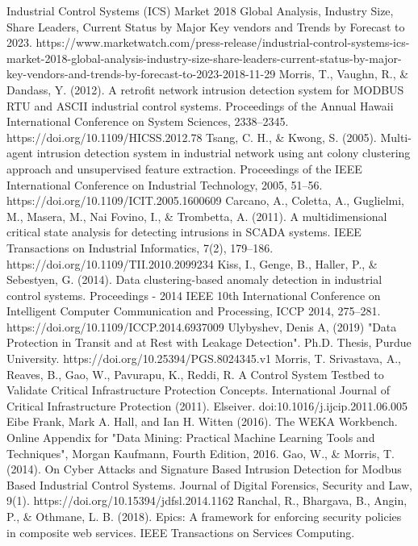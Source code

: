 \documentclass[conference]{IEEEtran}
\begin{document}
\begin{thebibliography}{00}
Industrial Control Systems (ICS) Market 2018 Global Analysis, Industry Size, Share Leaders, Current Status by Major Key vendors and Trends by Forecast to 2023. https://www.marketwatch.com/press-release/industrial-control-systems-ics-market-2018-global-analysis-industry-size-share-leaders-current-status-by-major-key-vendors-and-trends-by-forecast-to-2023-2018-11-29
Morris, T., Vaughn, R., \& Dandass, Y. (2012). A retrofit network intrusion detection system for MODBUS RTU and ASCII industrial control systems. Proceedings of the Annual Hawaii International Conference on System Sciences, 2338–2345. https://doi.org/10.1109/HICSS.2012.78
Tsang, C. H., \& Kwong, S. (2005). Multi-agent intrusion detection system in industrial network using ant colony clustering approach and unsupervised feature extraction. Proceedings of the IEEE International Conference on Industrial Technology, 2005, 51–56. https://doi.org/10.1109/ICIT.2005.1600609
Carcano, A., Coletta, A., Guglielmi, M., Masera, M., Nai Fovino, I., \& Trombetta, A. (2011). A multidimensional critical state analysis for detecting intrusions in SCADA systems. IEEE Transactions on Industrial Informatics, 7(2), 179–186. https://doi.org/10.1109/TII.2010.2099234
Kiss, I., Genge, B., Haller, P., \& Sebestyen, G. (2014). Data clustering-based anomaly detection in industrial control systems. Proceedings - 2014 IEEE 10th International Conference on Intelligent Computer Communication and Processing, ICCP 2014, 275–281. https://doi.org/10.1109/ICCP.2014.6937009
 Ulybyshev, Denis A, (2019) "Data Protection in Transit and at Rest with Leakage Detection". Ph.D. Thesis, Purdue University. https://doi.org/10.25394/PGS.8024345.v1
Morris, T. Srivastava, A., Reaves, B., Gao, W., Pavurapu, K., Reddi, R. A Control System Testbed to Validate Critical Infrastructure Protection Concepts. International Journal of Critical Infrastructure Protection (2011). Elseiver. doi:10.1016/j.ijcip.2011.06.005
Eibe Frank, Mark A. Hall, and Ian H. Witten (2016). The WEKA Workbench. Online Appendix for "Data Mining: Practical Machine Learning Tools and Techniques", Morgan Kaufmann, Fourth Edition, 2016.
Gao, W., \& Morris, T. (2014). On Cyber Attacks and Signature Based Intrusion Detection for Modbus Based Industrial Control Systems. Journal of Digital Forensics, Security and Law, 9(1). https://doi.org/10.15394/jdfsl.2014.1162
Ranchal, R., Bhargava, B., Angin, P., \& Othmane, L. B. (2018). Epics: A framework for enforcing security policies in composite web services. IEEE Transactions on Services Computing.

\end{thebibliography}
\vspace{12pt}
\end{document}
